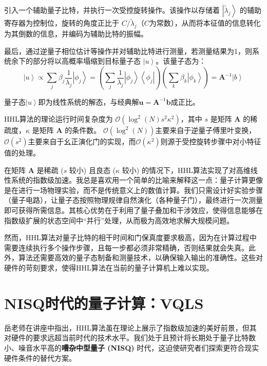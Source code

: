 \documentclass[12pt, a4paper]{article}
\newcommand{\ivec}[1]{\bm{#1}}                  %
\newcommand{\scalarfield}{u}                    %
\newcommand{\ket}[1]{\left| #1 \right\rangle}   %
\newcommand{\bra}[1]{\left\langle #1 \right|}   %
\newcommand{\mat}[1]{\mathbf{#1}}               %
\begin{document}
引入一个辅助量子比特，并执行一次受控旋转操作。该操作以存储着 $\ket{\tilde{\lambda}_j}$ 的辅助寄存器为控制位，旋转的角度正比于 $C/\tilde{\lambda}_j$（$C$为常数），从而将本征值的信息转化为其倒数的信息，并编码为辅助比特的振幅。

最后，通过逆量子相位估计等操作并对辅助比特进行测量，若测量结果为1，则系统余下的部分将以高概率塌缩到目标量子态 $\ket{\scalarfield}$。该量子态为：
\begin{equation*}
    \ket{\scalarfield} \propto \sum_j \beta_j \frac{1}{\lambda_j} \ket{\phi_j} = \left( \sum_j \frac{1}{\lambda_j} \ket{\phi_j}\bra{\phi_j} \right) \left( \sum_k \beta_k \ket{\phi_k} \right) = \mat{A}^{-1} \ket{b}
\end{equation*}

量子态$\ket{\scalarfield}$即为线性系统的解态，与经典解$\ivec{\scalarfield} = \mat{A}^{-1}\ivec{b}$成正比。

HHL算法的理论运行时间复杂度为 $\mathcal{O}(\log^2(N) s^2 \kappa^2)$，其中 $s$ 是矩阵 $\mat{A}$ 的稀疏度，$\kappa$ 是矩阵 $\mat{A}$ 的条件数。
$\mathcal{O}(\log^2(N))$主要来自于逆量子傅里叶变换，$\mathcal{O}(s^2)$主要来自于幺正演化门的实现，而$\mathcal{O}(\kappa^2)$则源于受控旋转步骤中对小特征值的处理。

在矩阵 $\mat{A}$ 是稀疏 ($s$ 较小) 且良态 ($\kappa$ 较小) 的情况下，HHL算法实现了对高维线性系统的指数级加速。我总是喜欢用一个简单的比喻来解释这一点：量子计算更像是在进行一场物理实验，而不是传统意义上的数值计算。我们只需设计好实验步骤（量子电路），让量子态按照物理规律自然演化（各种量子门），最终进行一次测量即可获得所需信息。其核心优势在于利用了量子叠加和干涉效应，使得信息能够在指数级扩展的状态空间中“并行”处理，从而极为高效地求解大规模问题。

然而，HHL算法对量子比特的相干时间和门保真度要求极高，因为在计算过程中需要连续执行多个操作步骤，且每一步都必须非常精确，否则结果就会失真。此外，算法还需要高效的量子态制备和测量技术，以确保输入输出的准确性。这些对硬件的苛刻要求，使得HHL算法在当前的量子计算机上难以实现。



\section{NISQ时代的量子计算：VQLS}

岳老师在讲座中指出，HHL算法虽在理论上展示了指数级加速的美好前景，但其对硬件的要求远超当前时代的技术水平。我们处于且预计将长期处于量子比特数小、噪音水平高的\textbf{嘈杂中型量子 (NISQ)} 时代，这迫使研究者们探索更符合现实硬件条件的替代方案。
\end{document}
